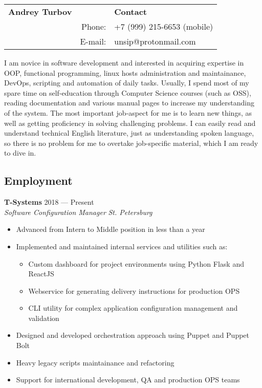 \documentclass[12pt]{report}
\newenvironment{JobDescription}[4]{
    {\bf #1 } \hfill { #2}
    \\
    {\em #3 } \hfill {\em #4 }
    \begin{itemize}
} {
    \end{itemize}
}
\begin{document}
\begin{tabular}{p{}rp{}}
    \bf{\LARGE{Andrey Turbov}} & & {\bf Contact} \\
    & {\small Phone:} & {\small +7 (999) 215-6653 (mobile)} \\
    & {\small E-mail:} & {\small unsip@protonmail.com} \\
\end{tabular}

\vspace{10mm}
{\noindent I am novice in software development and interested in acquiring
expertise in OOP, functional programming, linux hosts administration and
maintainance, DevOps, scripting and automation of daily tasks. Usually, I spend
most of my spare time on self-education through Computer Science courses (such
as OSS), reading documentation and various manual pages to increase my
understanding of the system. The most important job-aspect for me is to learn
new things, as well as getting proficiency in solving challenging problems. I
can easily read and understand technical English literature, just as
understanding spoken language, so there is no problem for me to overtake
job-specific material, which I am ready to dive in.
}

\subsection*{Employment}
\begin{JobDescription}{T-Systems}{2018 --- Present}{Software Configuration Manager}{St. Petersburg}
    \item Advanced from Intern to Middle position in less than a year
    \item Implemented and maintained internal services and utilities such as:
    \begin{itemize}
        \item Custom dashboard for project environments using Python Flask and ReactJS
        \item Webservice for generating delivery instructions for production OPS
        \item CLI utility for complex application configuration management and validation
    \end{itemize}
    \item Designed and developed orchestration approach using Puppet and Puppet Bolt
    \item Heavy legacy scripts maintainance and refactoring
    \item Support for international development, QA and production OPS teams
\end{JobDescription}
\end{document}
